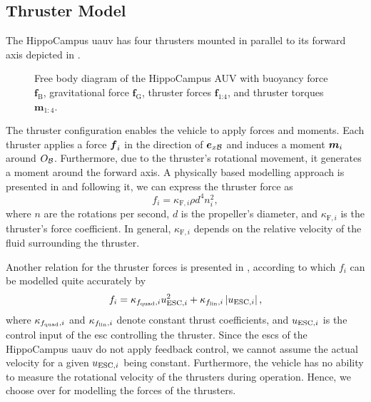 \subsection{Thruster Model}
\label{sec:thruster-model}
The HippoCampus \ac{uauv} has four thrusters mounted in parallel to its forward axis depicted in .
\begin{figure}[h!]
	\centering
	
	\caption{Free body diagram of the HippoCampus \mu AUV with buoyancy force $\bm{f}_\textrm{B}$, gravitational force $\bm{f}_\textrm{G}$, thruster forces $\bm{f}_\textrm{1:4}$, and thruster torques $\bm{m}_{1:4}$.}
	\label{fig:free-body-diagram}
\end{figure}
The thruster configuration enables the vehicle to apply forces and moments.
Each thruster applies a force $\mbox{$\bm{f}$}_{i}$ in the direction of $\mbox{$\bm{e}$}_{x\mathcal{B}}$ and induces a moment $\mbox{$\bm{m}$}_{i}$ around $O_{\mathcal{B}}$.
Furthermore, due to the thruster's rotational movement, it generates a moment around the forward axis. A physically based modelling approach is presented in \cite{Newman77} and following it, we can express the thruster force as
\begin{equation}
	\label{eq:thrust-function-newman}
	f_i = \kappa_{\text{F},i}\rho d^4 n_i^2
	,
\end{equation}
where $n$ are the rotations per second, $d$ is the propeller's diameter, and $\kappa_{\text{F},i}$ is the thruster's force coefficient. In general, $\kappa_{\text{F},i}$ depends on the relative velocity of the fluid surrounding the thruster.

Another relation for the thruster forces is presented in \cite{Hastedt19}, according to which $f_i$ can be modelled quite accurately by
\begin{equation}
	\label{eq:thrust-function-hastedt}
	f_i = \kappa_{f_{\text{quad}}, i} u_{\text{ESC},i}^2
	+ \kappa_{f_{\text{lin}}, i} \left\lvert u_{\text{ESC},i} \right\rvert
	,
\end{equation}
where $\kappa_{f_{\text{quad}}, i}$ and $\kappa_{f_{\text{lin}}, i}$ denote constant thrust coefficients, and $u_{\text{ESC},i}$ is the control input of the \ac{esc} controlling the thruster.
Since the \acp{esc} of the HippoCampus \ac{uauv} do not apply feedback control, we cannot assume the actual velocity for a given $u_{\text{ESC},i}$ being constant.
Furthermore, the vehicle has no ability to measure the rotational velocity of the thrusters during operation.
Hence, we choose  over  for modelling the forces of the thrusters.

